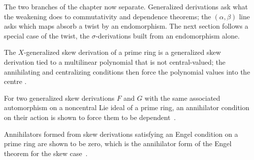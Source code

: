 The two branches of the chapter now separate. %
Generalized derivations ask what the weakening does to commutativity and
dependence theorems; the $(\alpha,\beta)$ line asks which maps absorb a twist
by an endomorphism. %
The next section follows a special case of the twist, the $\sigma$-derivations
built from an endomorphism alone. %

The $X$-generalized skew derivation of a prime ring is a generalized skew derivation tied to a multilinear polynomial that is not central-valued; the annihilating and centralizing conditions then force the polynomial values into the centre \cite[Abstract]{XGeneralizedSkewAnnihilating2022}.

For two generalized skew derivations $F$ and $G$ with the same associated automorphism on a noncentral Lie ideal of a prime ring, an annihilator condition on their action is shown to force them to be dependent~\cite{WlAnnihilatorConditionsWithGener2019}.

Annihilators formed from skew derivations satisfying an Engel condition on a prime ring are shown to be zero, which is the annihilator form of the Engel theorem for the skew case~\cite{WlAnnihilatorsOfSkewDerivationsW2019}.

